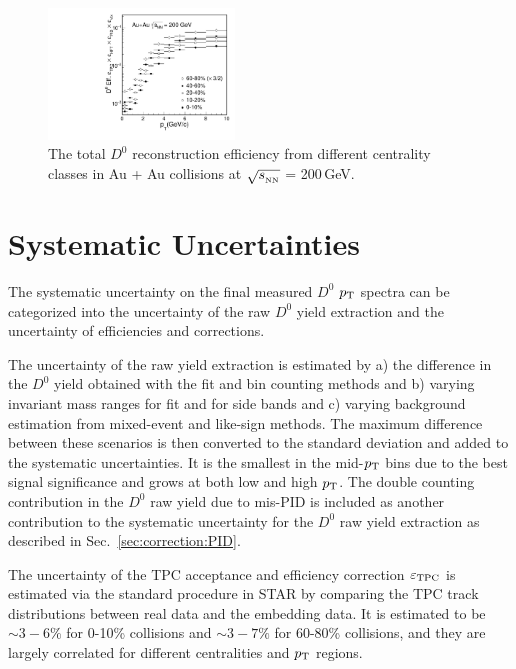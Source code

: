 \documentclass[%
 reprint,	
 amsmath,amssymb,
 aps,
 prc,
]{revtex4-1}
\providecommand{\DIFaddbeginFL}{} %
\providecommand{\DIFaddendFL}{} %
\providecommand{\DIFdelbeginFL}{} %
\providecommand{\DIFdelendFL}{} %
\begin{document}
\begin{figure}
\centering
\DIFdelbeginFL %
\DIFdelendFL \DIFaddbeginFL \includegraphics[width=0.44\textwidth]{fig/Datad0Eff_10.pdf}
\DIFaddendFL \caption{The total $D^{0}$ reconstruction efficiency from different centrality classes in Au + Au collisions at $\sqrt{s_{_{\rm NN}}}$ = 200\,GeV.}
\label{fig:Datad0Eff} 
\end{figure}

\section{\label{sec:systematic}Systematic Uncertainties}

The systematic uncertainty on the final measured $D^0$ $p_{\rm T}$ spectra can be categorized into the uncertainty of the raw $D^0$ yield extraction and the uncertainty of efficiencies and corrections.

The uncertainty of the raw yield extraction is estimated by a) the difference in the $D^0$ yield obtained with the fit and bin counting methods and b) varying invariant mass ranges for fit and for side bands and c) varying background estimation from mixed-event and like-sign methods. The maximum difference between these scenarios is then converted to the standard deviation and added to the systematic uncertainties. It is the smallest in the mid-$p_{\rm T}$ bins due to the best signal significance and grows at both low and high $p_{\rm T}$. The double counting contribution in the $D^0$ raw yield  due to mis-PID is included as another contribution to the systematic uncertainty for the $D^0$ raw yield extraction as described in Sec.~\ref{sec:correction:PID}.

The uncertainty of the TPC acceptance and efficiency correction $\varepsilon_{\rm TPC}$ is estimated via the standard procedure in STAR by comparing the TPC track distributions between real data and the embedding data. It is estimated to be $\sim 3-6\%$ for 0-10\% collisions and $\sim 3-7\%$ for 60-80\% collisions, and they are largely correlated for different centralities and $p_{\rm T}$ regions. 
\end{document}
